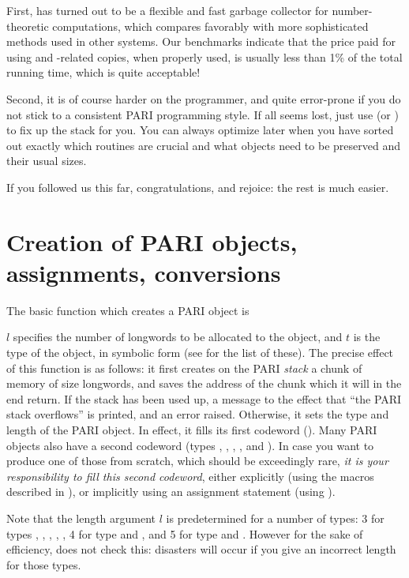 
First,  has turned out to be a flexible and fast garbage
collector for number-theoretic computations, which compares favorably with
more sophisticated methods used in other systems. Our benchmarks indicate
that the price paid for using  and -related
copies, when properly used, is usually less than 1\% of the total
running time, which is quite acceptable!

Second, it is of course harder on the programmer, and quite error-prone
if you do not stick to a consistent PARI programming style. If all seems
lost, just use  (or ) to fix up the stack
for you. You can always optimize later when you have sorted out exactly which
routines are crucial and what objects need to be preserved and their usual
sizes.

\smallskip If you followed us this far, congratulations, and rejoice: the
rest is much easier.

\section{Creation of PARI objects, assignments, conversions}

The basic function which creates a PARI object is

$l$ specifies the number of longwords to be allocated to the
object, and $t$ is the type of the object, in symbolic
form (see  for the list of these). The precise effect of
this function is as follows: it first creates on the PARI \emph{stack} a
chunk of memory of size  longwords, and saves the address of the
chunk which it will in the end return. If the stack has been used up, a
message to the effect that ``the PARI stack overflows'' is printed,
and an error raised. Otherwise, it sets the type and length of the PARI object.
In effect, it fills its first codeword (). Many PARI
objects also have a second codeword (types , ,
, , and ). In case you want to produce one of
those from scratch, which should be exceedingly rare, \emph{it is your
responsibility to fill this second codeword}, either explicitly (using the
macros described in ), or implicitly using an assignment
statement (using ).

Note that the length argument $l$ is predetermined for a number of types:
3 for types , , , ,
, 4 for type  and , and 5 for type 
and . However for the sake of efficiency,
 does not check this: disasters will occur if you give an incorrect
length for those types.

